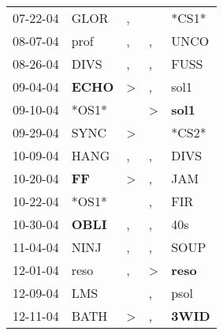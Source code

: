 \begin{supertabular}{p{0.07\textwidth}p{0.06\textwidth}p{0.02\textwidth}p{0.02\textwidth}p{0.06\textwidth}}
          07-22-04\textsuperscript{} &           GLOR\textsuperscript{} &                , &                  &                            *CS1* \\
          08-07-04\textsuperscript{} &           prof\textsuperscript{} &                , &                , &           UNCO\textsuperscript{} \\
          08-26-04\textsuperscript{} &           DIVS\textsuperscript{} &                , &                , &           FUSS\textsuperscript{} \\
          09-04-04\textsuperscript{} &  \textbf{ECHO\textsuperscript{}} &     \textgreater &                , &           sol1\textsuperscript{} \\
          09-10-04\textsuperscript{} &                            *OS1* &                  &     \textgreater &  \textbf{sol1\textsuperscript{}} \\
          09-29-04\textsuperscript{} &           SYNC\textsuperscript{} &     \textgreater &                  &                            *CS2* \\
          10-09-04\textsuperscript{} &           HANG\textsuperscript{} &                , &                , &           DIVS\textsuperscript{} \\
          10-20-04\textsuperscript{} &    \textbf{FF\textsuperscript{}} &     \textgreater &                , &            JAM\textsuperscript{} \\
          10-22-04\textsuperscript{} &                            *OS1* &                  &                , &            FIR\textsuperscript{} \\
          10-30-04\textsuperscript{} &  \textbf{OBLI\textsuperscript{}} &                , &                , &            40s\textsuperscript{} \\
          11-04-04\textsuperscript{} &           NINJ\textsuperscript{} &                , &                , &           SOUP\textsuperscript{} \\
          12-01-04\textsuperscript{} &           reso\textsuperscript{} &                , &     \textgreater &  \textbf{reso\textsuperscript{}} \\
          12-09-04\textsuperscript{} &            LMS\textsuperscript{} &                  &                , &           psol\textsuperscript{} \\
          12-11-04\textsuperscript{} &           BATH\textsuperscript{} &     \textgreater &                , &  \textbf{3WID\textsuperscript{}} \\

\end{supertabular}
